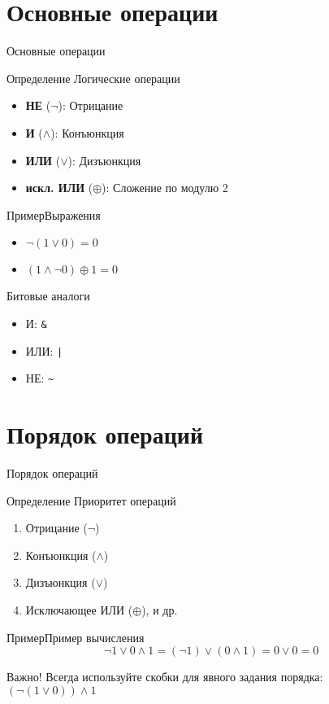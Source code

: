 \documentclass{beamer}
\newenvironment{rusdefinition}[1][Определение]{
    \begin{block}{#1}
}{\end{block}}
\newenvironment{rexample}[1][Пример]{\begin{exampleblock}{#1}}{\end{exampleblock}}
\begin{document}
\section{Основные операции}
\begin{frame}{Основные операции}
\begin{rusdefinition}{Логические операции}
\begin{itemize}
\item \textbf{НЕ} ($\neg$): Отрицание
\item \textbf{И} ($\land$): Конъюнкция
\item \textbf{ИЛИ} ($\lor$): Дизъюнкция
\item \textbf{искл. ИЛИ} ($\oplus$): Сложение по модулю 2 
\end{itemize}
\end{rusdefinition}

\begin{rexample}{Выражения}
\begin{itemize}
\item $\neg(1 \lor 0) = 0$
\item $(1 \land \neg 0) \oplus 1 = 0$
\end{itemize}
\end{rexample}

\begin{block}{Битовые аналоги}
\begin{itemize}
\item И: \texttt{\&}
\item ИЛИ: \texttt{|}
\item НЕ: \texttt{\~}
\end{itemize}
\end{block}
\end{frame}

\section{Порядок операций}
\begin{frame}{Порядок операций}
\begin{rusdefinition}{Приоритет операций}
\begin{enumerate}
\item Отрицание ($\neg$)
\item Конъюнкция ($\land$)
\item Дизъюнкция ($\lor$)
\item Исключающее ИЛИ ($\oplus$), и др.
\end{enumerate}
\end{rusdefinition}

\begin{rexample}{Пример вычисления}
\[
\neg 1 \lor 0 \land 1 = (\neg 1) \lor (0 \land 1) = 0 \lor 0 = 0
\]
\end{rexample}

\begin{alertblock}{Важно!}
Всегда используйте скобки для явного задания порядка:
$(\neg (1 \lor 0)) \land 1$
\end{alertblock}
\end{frame}
\end{document}
